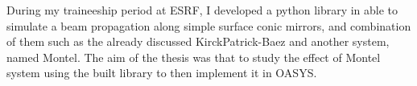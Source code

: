 During my traineeship period at ESRF, I developed a python library in able to simulate a beam propagation along simple surface conic mirrors, and combination of them such as the already discussed KirckPatrick-Baez and another system, named Montel. The aim of the thesis was that to study the effect of Montel system using the built library to then implement it in OASYS.
\medskip
%
%
%
%
\endgroup			
%
%
